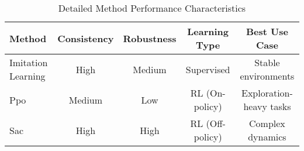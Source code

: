 \begin{table}[htbp]
\centering
\caption{Detailed Method Performance Characteristics}
\label{tab:method_comparison}
\begin{tabular}{lcccc}
\toprule
Method & Consistency & Robustness & Learning Type & Best Use Case \\
\midrule

Imitation Learning & High & Medium & Supervised & Stable environments \\
Ppo & Medium & Low & RL (On-policy) & Exploration-heavy tasks \\
Sac & High & High & RL (Off-policy) & Complex dynamics \\

\bottomrule
\end{tabular}
\end{table}
